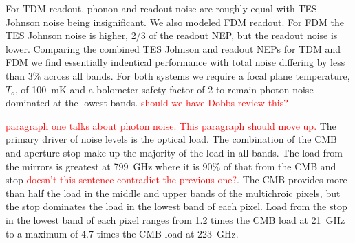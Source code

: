 \documentclass[]{spie}  %
\newcommand{\comr}[1]{\textcolor{red}{#1}}
\begin{document}
For TDM readout, phonon and readout noise are roughly equal with TES Johnson noise being insignificant.  We also modeled 
FDM readout.  For FDM the TES Johnson noise is higher, 2/3 of the readout NEP, but the readout 
noise is lower.  Comparing the combined TES Johnson and readout NEPs for TDM and FDM we find essentially indentical performance 
with total noise differing by less than 3\% across all bands.  For both systems we require a focal plane temperature, $T_o$, of 
100~mK and a bolometer safety factor of 2 to remain photon noise dominated at the lowest bands. 
\comr{should we have Dobbs review this?}

\comr{paragraph one talks about photon noise. This paragraph should move up.} 
The primary driver of noise levels is the optical load.  The combination of the CMB and aperture stop make up the 
majority of the load in all bands. The load from the mirrors is greatest at 799~GHz where it is 90\% of that from the 
CMB and stop \comr{doesn't this sentence contradict the previous one?}. The CMB provides more than half the load 
in the middle and upper bands of the multichroic pixels, but the stop dominates the load in the lowest band of each pixel.  
Load from the stop in the lowest band of each pixel ranges from 1.2 times the CMB load at 21~GHz to a maximum of 4.7 
times the CMB load at 223~GHz. 


\end{document}
